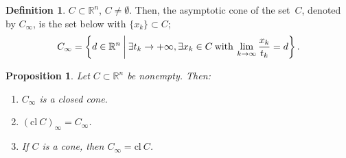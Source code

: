 \documentclass[a4paper,11pt, oneside]{book}
\newtheorem{prop}[thm]{Proposition}
\theoremstyle{definition}
\newtheorem{dfn}[thm]{Definition}
\newcommand{\NDemenstionalRealEuclideanSpace}{\mathbb{R}^n}
\begin{document}
\begin{dfn}
  $C \subset \mathbb{R}^n$, $C \neq \emptyset$. Then, the asymptotic cone of the set~$C$, denoted by $C_\infty$, is the set below with $\{ x_k \} \subset C$;
  \begin{equation}
    C_\infty = \left\{ d \in
    \mathbb{R}^n \:\middle|\: \exists t_k \rightarrow +\infty, \exists x_k \in C \:\text{\rm with}\: \lim_{k \to \infty} \frac{x_k}{t_k} = d \right\}. \notag
  \end{equation}
\end{dfn}

\begin{prop}\label{basicPropositionOfAsymptoticCone}
  Let $C \subset \NDemenstionalRealEuclideanSpace$ be nonempty. Then:
  \begin{enumerate}[label=\roman*,align=CenterWithParen]
    \item $C_{\infty}$ is a closed cone.
    \item $(\text{cl}\:C)_{\infty} = C_{\infty}$.
    \item If $C$ is a cone, then $C_{\infty} = \text{cl}\:C$.
  \end{enumerate}
\end{prop}
\end{document}
